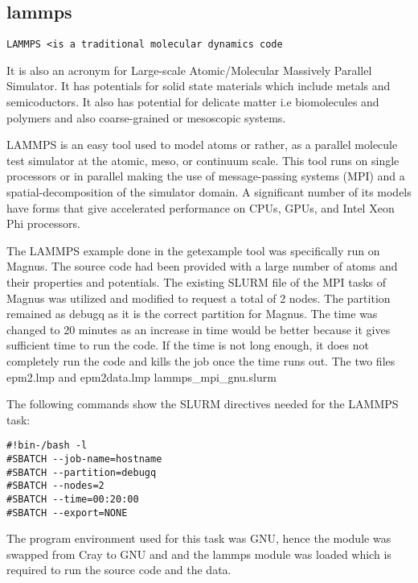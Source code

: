 \subsection{lammps}

\begin{Verbatim}[fontsize=\scriptsize]
LAMMPS <is a traditional molecular dynamics code
\end{Verbatim} 

It is also an acronym for Large-scale Atomic/Molecular Massively Parallel Simulator. It has potentials
for solid state materials which include metals and semicoductors. It also has potential for delicate matter i.e biomolecules and polymers and also
coarse-grained or mesoscopic systems.

LAMMPS is an easy tool used to model atoms or rather, as a parallel molecule test simulator at the atomic, meso, or continuum scale. This tool runs on
single processors or in parallel making the use of message-passing systems (MPI) and a spatial-decomposition of the simulator domain. A significant
number of its models have forms that give accelerated performance on CPUs, GPUs, and Intel Xeon Phi processors.

The LAMMPS example done in the getexample tool was specifically run on Magnus. The source code had been provided with a large number of atoms and their
properties and potentials. The existing SLURM file of the MPI tasks of Magnus was utilized and modified to request a total of 2 nodes. The partition
remained as debugq as it is the correct partition for Magnus. The time was changed to 20 minutes as an increase in time would be better because it gives
sufficient time to run the code. If the time is not long enough, it does not completely run the code and kills the job once the time runs out.
The two files epm2.lmp and epm2data.lmp  lammps\_mpi\_gnu.slurm

The following commands show the SLURM directives needed for the LAMMPS task:

\begin{tcolorbox}
\begin{Verbatim}[fontsize=\scriptsize]
#!bin-/bash -l
#SBATCH --job-name=hostname
#SBATCH --partition=debugq
#SBATCH --nodes=2
#SBATCH --time=00:20:00
#SBATCH --export=NONE
\end{Verbatim}
\end{tcolorbox}

The program environment used for this task was GNU, hence the module was swapped from Cray to GNU and and the lammps module was loaded which is required
to run the source code and the data.

